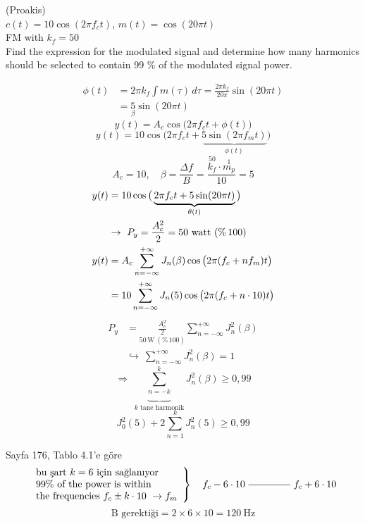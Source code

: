 \documentclass[11pt,a4paper]{article}
\begin{document}
\begin{ornek}
(Proakis)\\
$c(t)=10\cos(2\pi f_c t)$, $m(t)=\cos(20\pi t)$\\
FM with $k_f=50$\\
Find the expression for the modulated signal and determine how many harmonics should be selected to contain 99 \% of the modulated signal power.
\end{ornek}
\begin{align*}
\phi(t)&=2\pi k_f\int m(\tau)\,d\tau=\frac{2\pi k_f}{20\pi}\sin(20\pi t)\\
&=\underset{\beta}{5}\sin(20\pi t)
\end{align*}
\[ y(t)=A_c\cos\big(2\pi f_c t+\phi(t)\big) \]
\[ y(t)=10\cos\big(2\pi f_c t+\underbrace{5\sin(2\pi f_m t)}_{\phi(t)}\big) \]
\[ A_c=10,\quad \beta=\frac{\Delta f}{B}=\frac{\overset{50}{k_f}\cdot\overset{1}{m_p}}{10}=5 \]
\begin{align*}
y(t)&=10\cos\big(\underbrace{2\pi f_c t+5\sin(20\pi t)}_{\theta(t)}\big)\\
&\to\ P_y=\frac{A_c^2}{2}=50\ \text{watt (\%\,100)}\\
y(t)&=A_c\sum_{n=-\infty}^{+\infty}J_n(\beta)\cos\big(2\pi(f_c+nf_m)t\big)\\
&=10\sum_{n=-\infty}^{+\infty}J_n(5)\cos\big(2\pi(f_c+n\cdot10)t\big)
\end{align*}
\begin{align*}
P_y&=\underset{50\,\mathrm{W}\ (\%\,100)}{\frac{A_c^2}{2}}\sum_{n=-\infty}^{+\infty}J_n^2(\beta)\\
&\hookrightarrow\ \sum_{n=-\infty}^{+\infty}J_n^2(\beta)=1
\end{align*}
\[ \Rightarrow\ \underbrace{\sum_{n=-k}^{k}}_{k\text{ tane harmonik}}J_n^2(\beta)\ge0{,}99 \]
\[ J_0^2(5)+2\sum_{n=1}^{k}J_n^2(5)\ge0{,}99 \]

Sayfa 176, Tablo 4.1'e göre
\[
\left.\begin{array}{l}
\text{bu şart }k=6\text{ için sağlanıyor}\\
\text{99\% of the power is within}\\
\text{the frequencies }f_c\pm k\cdot10\ \to f_m
\end{array}\right\}\quad f_c-6\cdot10\ \rule[0.5ex]{1.5cm}{0.4pt}\ f_c+6\cdot10
\]
\[ \text{B gerektiği}=2\times6\times10=120\ \mathrm{Hz} \]
\end{document}
